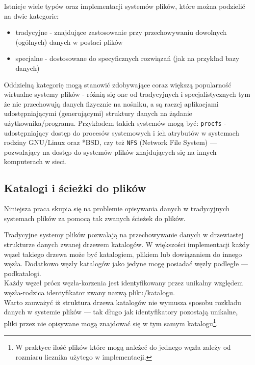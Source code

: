 \par
Istnieje wiele typów oraz implementacji systemów plików, które można podzielić na dwie kategorie:

\begin{itemize}
\item tradycyjne - znajdujące zastosowanie przy przechowywaniu dowolnych (ogólnych) danych w postaci plików
\item specjalne - dostosowane do specyficznych rozwiązań (jak na przykład bazy danych)
\end{itemize}

Oddzielną kategorię mogą stanowić zdobywające coraz większą popularność wirtualne systemy plików - różnią się one od tradycyjnych i specjalistycznych tym że nie przechowują danych fizycznie na nośniku, a są raczej aplikacjami udostępniającymi (generującymi) struktury danych na żądanie użytkownika/programu. Przykładem takich systemów mogą być: \texttt{procfs} - udostępniający dostęp do procesów systemowych i ich atrybutów w systemach rodziny GNU/Linux oraz *BSD, czy też \texttt{NFS} (Network File System) --- pozwalający na dostęp do systemów plików znajdujących się na innych komputerach w sieci.

\subsection{Katalogi i ścieżki do plików}
\par
Niniejsza praca skupia się na problemie opisywania danych w tradycyjnych systemach plików za pomocą tak zwanych ścieżek do plików.

\par
Tradycyjne systemy plików pozwalają na przechowywanie danych w drzewiastej strukturze danych zwanej drzewem katalogów. W większości implementacji każdy węzeł takiego drzewa może być katalogiem, plikiem lub dowiązaniem do innego węzła. Dodatkowo węzły katalogów jako jedyne mogę posiadać węzły podległe --- podkatalogi.\\
Każdy węzeł prócz węzła-korzenia jest identyfikowany przez unikalny względem węzła-rodzica identyfikator zwany nazwą pliku/katalogu.\\
Warto zauważyć iż struktura drzewa katalogów nie wymusza sposobu rozkładu danych w systemie plików --- tak długo jak identyfikatory pozostają unikalne, pliki przez nie opisywane mogą znajdować się w tym samym katalogu\footnote{W praktyce ilość plików które mogą należeć do jednego węzła zależy od rozmiaru licznika użytego w implementacji.}.


